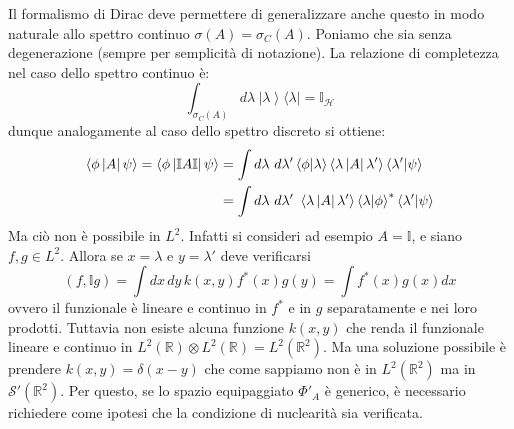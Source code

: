 \documentclass[../../FisicaTeorica.tex]{subfiles}
\begin{document}
\begin{enumerate}
	Il formalismo di Dirac deve permettere di generalizzare anche questo in modo naturale allo spettro continuo $\sigma \left(A\right)= \sigma_C\left(A\right)$. Poniamo che sia senza degenerazione (sempre per semplicità di notazione).
	La relazione di completezza nel caso dello spettro continuo è:
	\[
	\int_{\sigma_C\left(A\right)}{d\lambda\ \left|\lambda\right\rangle\langle\lambda|}=\mathbb{I}_\mathcal{H}
	\]
	dunque analogamente al caso dello spettro discreto si ottiene:
	\begin{align}
	\left\langle\phi\left|A\right|\psi\right\rangle
	=\left\langle\phi\left|\mathbb{I}A\mathbb{I}\right|\psi\right\rangle&=
	\int d\lambda \  d\lambda'\left\langle\phi\middle|\lambda\right\rangle\left\langle\lambda\left|A\right|\lambda'\right\rangle\left\langle\lambda'\middle|\psi\right\rangle \notag \\
	& =\int d\lambda \ d\lambda' \ \left\langle\lambda\left|A\right|\lambda'\right\rangle\left\langle\lambda|\phi\right\rangle^\ast\left\langle\lambda'\middle|\psi\right\rangle \notag
	\end{align}
	Ma ciò non è possibile in $L^2$. Infatti si consideri ad esempio $A=\mathbb I$, e siano $f,g\in L^2$. Allora se $x = \lambda$ e $y = \lambda'$ deve verificarsi
	\[
	\left(f,\mathbb{I}g\right)=\int dx \, dy \, k\left(x,y\right)f^\ast\left(x\right)g\left(y\right)
	=\int f^\ast\left(x\right) g\left(x\right)dx
	\] ovvero il funzionale è lineare e continuo in $f^\ast$ e in $g$ separatamente e nei loro prodotti. Tuttavia non esiste alcuna funzione $k\left(x,y\right)$ che renda il funzionale lineare e continuo in $L^2\left(\mathbb{R}\right)\otimes L^2\left(\mathbb{R}\right) = L^2(\mathbb{R}^2)$.
	Ma una soluzione possibile è prendere $k\left(x,y\right)=\delta \left(x-y\right)$ che come sappiamo non è in $L^2\left(\mathbb{R}^2\right)$
	ma in $\mathcal{S}'\left(\mathbb{R}^2\right)$. Per questo, se lo spazio equipaggiato $\Phi'_A$ è generico, è necessario richiedere come ipotesi che la condizione di nuclearità sia verificata.
\end{enumerate}
\end{document}
